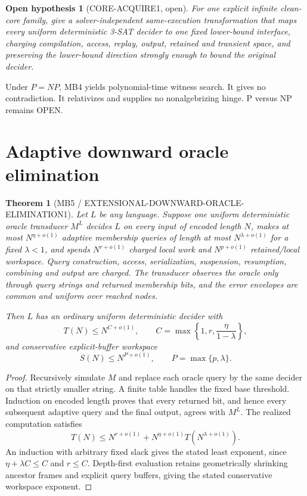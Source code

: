 \documentclass[11pt]{article}
\newtheorem{theorem}{Theorem}
\newtheorem{hypothesis}{Open hypothesis}
\begin{document}
\begin{hypothesis}[CORE-ACQUIRE1, open]
For one explicit infinite clean-core family, give a solver-independent
same-execution transformation that maps every uniform deterministic 3-SAT
decider to one fixed lower-bound interface, charging compilation, access,
replay, output, retained and transient space, and preserving the lower-bound
direction strongly enough to bound the original decider.
\end{hypothesis}

Under $P=NP$, MB4 yields polynomial-time witness search.  It gives no
contradiction.  It relativizes and supplies no nonalgebrizing hinge.
P versus NP remains OPEN.

\section{Adaptive downward oracle elimination}

\begin{theorem}[MB5 / EXTENSIONAL-DOWNWARD-ORACLE-ELIMINATION1]
Let $L$ be any language. Suppose one uniform deterministic oracle
transducer $M^L$ decides $L$ on every input of encoded length $N$, makes at
most $N^{\eta+o(1)}$ adaptive membership queries of length at most
$N^{\lambda+o(1)}$ for a fixed $\lambda<1$, and spends
$N^{r+o(1)}$ charged local work and $N^{p+o(1)}$ retained/local workspace.
Query construction, access, serialization, suspension, resumption,
combining and output are charged. The transducer observes the oracle only
through query strings and returned membership bits, and the error envelopes
are common and uniform over reached nodes.

Then $L$ has an ordinary uniform deterministic decider with
\[
 T(N)\le N^{C+o(1)},\qquad
 C=\max\left\{1,r,\frac{\eta}{1-\lambda}\right\},
\]
and conservative explicit-buffer workspace
\[
 S(N)\le N^{P+o(1)},\qquad P=\max\{p,\lambda\}.
\]
\end{theorem}

\begin{proof}
Recursively simulate $M$ and replace each oracle query by the same decider
on that strictly smaller string. A finite table handles the fixed base
threshold. Induction on encoded length proves that every returned bit, and
hence every subsequent adaptive query and the final output, agrees with
$M^L$. The realized computation satisfies
\[
 T(N)\le N^{r+o(1)}+N^{\eta+o(1)}T(N^{\lambda+o(1)}).
\]
An induction with arbitrary fixed slack gives the stated least exponent,
since $\eta+\lambda C\le C$ and $r\le C$. Depth-first evaluation retains
geometrically shrinking ancestor frames and explicit query buffers, giving
the stated conservative workspace exponent.
\end{proof}
\end{document}
